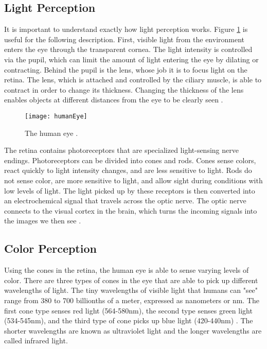 \subsection{Light Perception} \label{sight_perception} 

It is important to understand exactly how light perception works. Figure \ref{fig:humaneye} is useful for the following description. First, visible light from the environment enters the eye through the transparent cornea. The light intensity is controlled via the pupil, which can limit the amount of light entering the eye by dilating or contracting. Behind the pupil is the lens, whose job it is to focus light on the retina. The lens, which is attached and controlled by the ciliary muscle, is able to contract in order to change its thickness. Changing the thickness of the lens enables objects at different distances from the eye to be clearly seen \cite{mihelj_apps}. 

\begin{figure}[h]
	\centering
	\texttt{[image: humanEye]}
	\caption{The human eye \cite{mihelj_apps}.}
	\label{fig:humaneye}
\end{figure}

\par The retina contains photoreceptors that are specialized light-sensing nerve endings. Photoreceptors can be divided into cones and rods. Cones sense colors, react quickly to light intensity changes, and are less sensitive to light. Rods do not sense color, are more sensitive to light, and allow sight during conditions with low levels of light. The light picked up by these receptors is then converted into an electrochemical signal that travels across the optic nerve. The optic nerve connects to the visual cortex in the brain, which turns the incoming signals into the images we then see \cite{mihelj_apps}.

\subsection{Color Perception} \label{color_perception} 

Using the cones in the retina, the human eye is able to sense varying levels of color. There are three types of cones in the eye that are able to pick up different wavelengths of light. The tiny wavelengths of visible light that humans can "see" range from 380 to 700 billionths of a meter, expressed as nanometers or nm. The first cone type senses red light (564-580nm), the second type senses green light (534-545nm), and the third type of cone picks up blue light (420-440nm) \cite{mihelj_apps}. The shorter wavelengths are known as ultraviolet light and the longer wavelengths are called infrared light.


